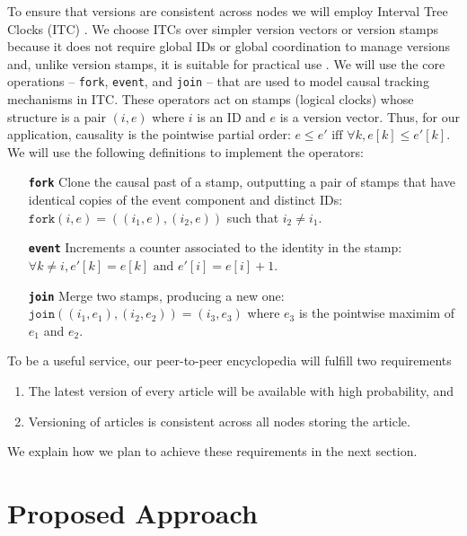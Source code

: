 \documentclass{article}
\begin{document}
To ensure that versions are consistent across nodes we will employ Interval Tree
Clocks (ITC) \cite{abf08}. We choose ITCs over simpler version vectors \cite{ppr83}
or version stamps \cite{abf02} because it does not require global IDs or global
coordination to manage versions and, unlike version stamps, it is suitable for
practical use \cite{abf07}. We will use the core operations -- \texttt{fork},
\texttt{event}, and \texttt{join} -- that are used to model causal tracking mechanisms
in ITC. These operators act on stamps (logical clocks) whose structure is a pair
$(i,e)$ where $i$ is an ID and $e$ is a version vector. Thus, for our application,
causality is the pointwise partial order: $e \leq e' \textrm{ iff } \forall{k}, e[k] \leq e'[k]$.
We will use the following definitions to implement the operators:

\begin{itemize}
  \item[\textbf{\texttt{fork}}] Clone the causal past of a stamp, outputting a pair of stamps that
  have identical copies of the event component and distinct IDs:
  $\texttt{fork}(i,e) = \left((i_{1},e),(i_{2},e)\right)$ such that $i_{2} \ne i_{1}$.

  \item[\textbf{\texttt{event}}] Increments a counter associated to the identity in the stamp:
  $\forall{k} \ne i, e'[k] = e[k] \textrm{ and } e'[i] = e[i] + 1$.

  \item[\textbf{\texttt{join}}] Merge two stamps, producing a new one:
  $\texttt{join}\left((i_{1},e_{1}),(i_{2},e_{2})\right) = (i_{3},e_{3})$ where $e_{3}$
  is the pointwise maximim of $e_{1}$ and $e_{2}$.
\end{itemize}

\noindent
To be a useful service, our peer-to-peer encyclopedia will fulfill two requirements
\begin{enumerate}[
  labelindent=\parindent,
  style=multiline,
  leftmargin=*,
  label=(SG\arabic*)
]
  \item The latest version of every article will be available with high probability, and
  \item Versioning of articles is consistent across all nodes storing the article.
\end{enumerate}

\noindent
We explain how we plan to achieve these requirements in the next section.

\section{Proposed Approach}
\end{document}
